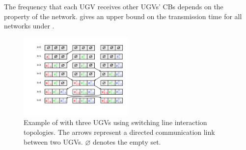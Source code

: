 	\begin{rem} 
		The frequency that each UGV receives other UGVs' CBs depends on the property of the network.
		 gives an upper bound on the transmission time for all {\fc} networks under {\proto}.
	\end{rem}
	
	
	
	\begin{figure}%
		\centering
		\includegraphics[width=0.5\textwidth]{figures/fifo}
		\caption{Example of {\proto} with three UGVs using switching line interaction topologies. The arrows represent a directed communication link between two UGVs. $\varnothing$ denotes the empty set.}
		\label{fig:\proto}
	\end{figure}		